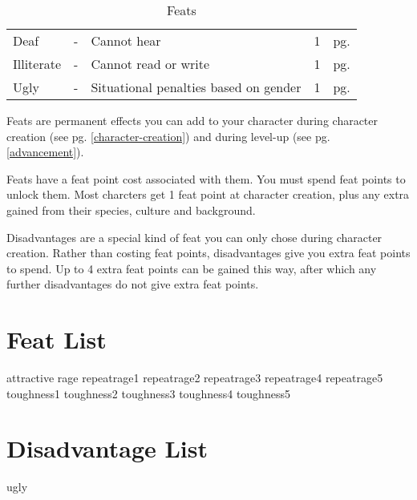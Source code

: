 \begin{multicols*}{2}
\begin{table*}[ht]
\begin{tabularx}{\textwidth}{l X X l l}
            Deaf & - & Cannot hear & 1 & pg. \pageref{flaw:deaf} \\
            Illiterate & - & Cannot read or write & 1 & pg. \pageref{flaw:illiterate} \\
            Ugly & - & Situational penalties based on gender & 1 & pg. \pageref{flaw:ugly} \\
        \end{tabularx}
        \caption{Feats}
        \label{tab:feats}
    \end{table*}

    Feats are permanent effects you can add to your character during character
    creation (see pg. \ref{character-creation}) and during level-up (see pg.
    \ref{advancement}).

    Feats have a feat point cost associated with them. You must spend feat
    points to unlock them. Most charcters get 1 feat point at character
    creation, plus any extra gained from their species, culture and background.

    Disadvantages are a special kind of feat you can only chose during
    character creation. Rather than costing feat points, disadvantages give you
    extra feat points to spend. Up to 4 extra feat points can be gained this
    way, after which any further disadvantages do not give extra feat points.

    \section{Feat List}
    {attractive}
    {rage}
    {repeatrage1}
    {repeatrage2}
    {repeatrage3}
    {repeatrage4}
    {repeatrage5}
    {toughness1}
    {toughness2}
    {toughness3}
    {toughness4}
    {toughness5}

    \section{Disadvantage List}
    {ugly}

\end{multicols*}
